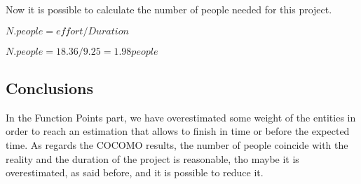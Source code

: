 		\vspace{0.5cm}
		Now it is possible to calculate	the number of people needed for this project.
		\vspace{0.5cm}
		\begin{center}
			\begin{math}
				N. people = effort / Duration
			\end{math}
		\end{center}
		\begin{center}
			\begin{math}
				N. people = 18.36 / 9.25 = 1.98 people
			\end{math}
		\end{center}
		\vspace{0.5cm}
	\subsection{Conclusions}
		In the Function Points part, we have overestimated some weight of the entities in order to reach an estimation that allows to finish in time or before the expected time. As regards the COCOMO results, the number of people coincide with the reality and the duration of the project is reasonable, tho maybe it is overestimated, as said before, and it is possible to reduce it.